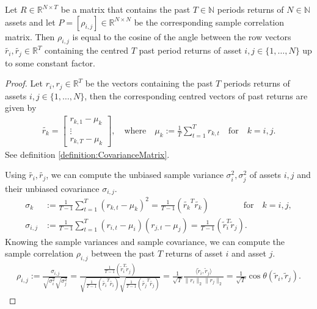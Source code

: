     \begin{theorem}\label{theorem:CorrelationCosineTimeseries}
        Let $R \in \mathbb{R}^{N \times T}$ be a matrix that contains the past $T \in \mathbb{N}$ periods returns of $N \in \mathbb{N}$ assets and let $P = [\rho_{i,j}] \in \mathbb{R}^{N \times N}$ be the corresponding sample correlation matrix. Then $\rho_{i,j}$ is equal to the cosine of the angle between the row vectors $\tilde{r_i}, \tilde{r_j} \in \mathbb{R}^T$ containing the centred $T$ past period returns of asset $i,j \in \{ 1, \dots, N \}$ up to some constant factor.
    \end{theorem}
    
    \begin{proof}
        Let $r_i, r_j \in \mathbb{R}^T$ be the vectors containing the past $T$ periods returns of assets $i,j \in \{ 1, \dots, N \}$, then the corresponding centred vectors of past returns are given by
        \begin{align*}
            \tilde{r_k} = \begin{bmatrix}
                r_{k,1} - \mu_k \\
                \vdots \\
                r_{k,T} - \mu_k
            \end{bmatrix}, \quad \text{where} \quad \mu_k := \frac{1}{T} \sum_{t=1}^T r_{k,t} \quad \text{for} \quad k = i,j.
        \end{align*}
        See definition \ref{definition:CovarianceMatrix}.
        
        Using $\tilde{r_i}, \tilde{r_j}$, we can compute the unbiased sample variance $\sigma_i^2, \sigma_j^2$ of assets $i,j$ and their unbiased covariance $\sigma_{i,j}$.
        \begin{align*}
            \sigma_k &:= \frac{1}{T-1} \sum_{t=1}^T (r_{k,t} - \mu_k)^2 = \frac{1}{T-1} (\tilde{r_k}^T \tilde{r_k}) \qquad \qquad \text{for} \quad k = i,j,\\
            \sigma_{i,j} &:= \frac{1}{T-1} \sum_{t=1}^T (r_{i,t} - \mu_i) (r_{j,t} - \mu_j) = \frac{1}{T-1} (\tilde{r}_i^T \tilde{r}_j).
        \end{align*}
        Knowing the sample variances and sample covariance, we can compute the sample correlation $\rho_{i,j}$ between the past $T$ returns of asset $i$ and asset $j$.
        \begin{align*}
            \rho_{i,j} := \frac{\sigma_{i,j}}{\sqrt{\sigma_i^2} \sqrt{\sigma_j^2}} = \frac{\frac{1}{T-1} (\tilde{r}_i^T \tilde{r}_j)}{\sqrt{\frac{1}{T-1} (\tilde{r_i}^T \tilde{r_i})} \sqrt{\frac{1}{T-1} (\tilde{r_j}^T \tilde{r_j})}} = \frac{1}{\sqrt{T}} \frac{\langle \tilde{r}_i, \tilde{r}_j \rangle}{\| r_i \|_2 \| r_j \|_2} = \frac{1}{\sqrt{T}} \cos \theta(\tilde{r}_i, \tilde{r}_j).
        \end{align*}
    \end{proof}
    
